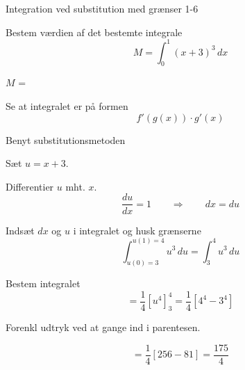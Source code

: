 \documentclass{article}
\begin{document}
\begin{exercise}{Integration ved substitution med grænser 1-6}
	
	
	Bestem værdien af det bestemte integrale
	\[
	M = \int_0^1 (x+3)^3 \, dx
	\]
	
	$M$ =  \\
	
	
	
	\hint
	
	Se at integralet er på formen
	\[
	f'(g(x)) \cdot g'(x)
	\]
	
	\hint
	
	Benyt substitutionsmetoden
	
	\hint
	
	Sæt $u=x+3$.
	
	
	\hint
	
	Differentier $u$ mht. $x$.
	\[
	\frac{du}{dx} = 1 \qquad	\Rightarrow \qquad dx = du
	\]
	
	\hint
	
	Indsæt $dx$ og $u$ i integralet og husk grænserne
	\[
	\int_{u(0)=3}^{u(1)=4} u^3  \, du = 	\int_{3}^{4} u^3 \, du
	\]
	
	\hint
	
	Bestem integralet
	\[
	= \frac{1}{4} \left[ u^4 \right] _3^4 = \frac{1}{4} \left[ 4^4-3^4  \right]
	\]
	
	\hint
	Forenkl udtryk ved at gange ind i parentesen.
	
	\hint
	
	\[
	=  \frac{1}{4} \left[ 256-81 \right] = \frac{175}{4}
	\]
	
	
\end{exercise}

\newpage
\end{document}
